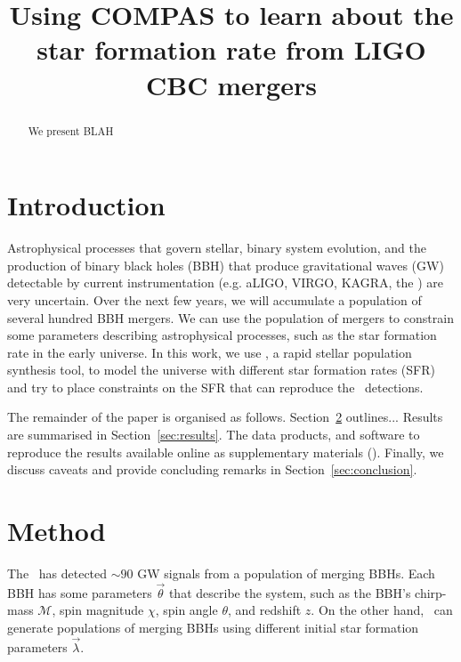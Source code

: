 \documentclass[floatfix,ApJL,twocolumn]{aastex631}
\begin{document}
\title{Using COMPAS to learn about the star formation rate from LIGO CBC mergers}







\begin{abstract}
We present BLAH
\end{abstract}




\section{Introduction} \label{sec:intro}

Astrophysical processes that govern stellar, binary system evolution, and the production of binary black holes (BBH) that produce gravitational waves (GW) detectable by current instrumentation (e.g. aLIGO, VIRGO, KAGRA, the \lvk) are very uncertain. 
Over the next few years, we will accumulate a population of several hundred BBH mergers. 
We can use the population of mergers to constrain some parameters describing astrophysical processes, such as the star formation rate in the early universe. 
In this work, we use \compas, a rapid stellar population synthesis tool, to model the universe with different star formation rates (SFR) and try to place constraints on the SFR that can reproduce the \lvk\ detections. 


The remainder of the paper is organised as follows.
Section~\ref{sec:method} outlines...
Results are summarised in Section~\ref{sec:results}.
The data products, and software to reproduce the results available online as supplementary materials (\projectUrl).
Finally, we discuss caveats and provide concluding remarks in Section~\ref{sec:conclusion}.

\section{Method} \label{sec:method}


The \lvk\ has detected $\sim90$ GW signals from a population of merging BBHs. 
Each BBH has some parameters $\vec{\theta}$ that describe the system, such as the BBH's chirp-mass $\mathcal{M}$, spin magnitude $\chi$, spin angle $\theta$, and redshift $z$.
On the other hand, \compas\ can generate populations of merging BBHs using different initial star formation parameters $\vec{\lambda}$. 
\end{document}
